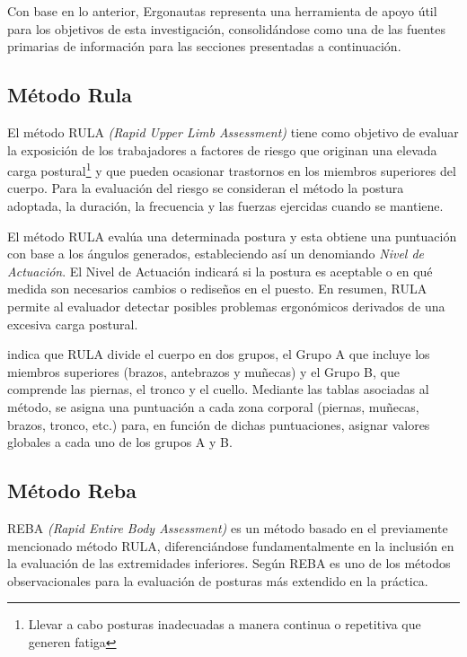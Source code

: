 Con base en lo anterior, Ergonautas representa una herramienta de apoyo útil para los objetivos de esta investigación, consolidándose como una de las fuentes primarias de información para las secciones presentadas a continuación.

\subsection{Método Rula}
El método RULA \textit{(Rapid Upper Limb Assessment)} tiene como objetivo de evaluar la exposición de los trabajadores a factores de riesgo que originan una elevada carga postural\footnote{Llevar a cabo posturas inadecuadas a manera continua o repetitiva que generen fatiga} y que pueden ocasionar trastornos en los miembros superiores del cuerpo. Para la evaluación del riesgo se consideran el método la postura adoptada, la duración, la frecuencia y las fuerzas ejercidas cuando se mantiene.\parencite[2]{Mcatamney1993RULA:Disorders}

El método RULA evalúa una determinada postura y esta obtiene una puntuación con base a los ángulos generados, estableciendo así un denomiando \textit{Nivel de Actuación}. El Nivel de Actuación indicará si la postura es aceptable o en qué medida son necesarios cambios o rediseños en el puesto. En resumen, RULA permite al evaluador detectar posibles problemas ergonómicos derivados de una excesiva carga postural.\parencite{Diego-Mas2015EvaluacionRULA}\parencite[4]{Mcatamney1993RULA:Disorders}

\parencite{Diego-Mas2015EvaluacionRULA} indica que RULA divide el cuerpo en dos grupos, el Grupo A que incluye los miembros superiores (brazos, antebrazos y muñecas) y el Grupo B, que comprende las piernas, el tronco y el cuello. Mediante las tablas asociadas al método, se asigna una puntuación a cada zona corporal (piernas, muñecas, brazos, tronco, etc.) para, en función de dichas puntuaciones, asignar valores globales a cada uno de los grupos A y B.
\subsection{Método Reba}
REBA \textit{(Rapid Entire Body Assessment)} es un método basado en el previamente mencionado método RULA, diferenciándose fundamentalmente en la inclusión en la evaluación de las extremidades inferiores. Según \parencite{Diego-Mas2015EvaluacionREBA} REBA es uno de los métodos observacionales para la evaluación de posturas más extendido en la práctica.

